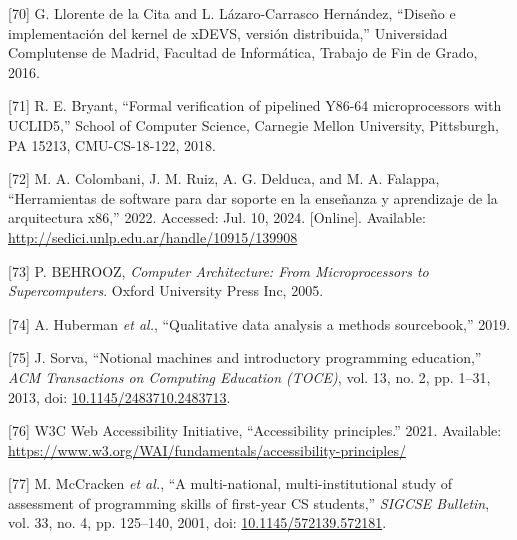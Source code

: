 \documentclass[12pt,oneside]{templates/unerthesis}
\newcommand{\CSLLeftMargin}[1]{#1} %
\newcommand{\CSLRightInline}[1]{#1} %
\newlength{\cslhangindent}
\newenvironment{CSLReferences}[2] %
 {\setlength{\parindent}{0pt}%
  \setlength{\leftskip}{#1 pt\relax}%
  \setlength{\parskip}{#2 pt\relax}%
  \everypar{\setlength{\hangindent}{\cslhangindent}}}
 {\par}
\begin{document}
\begin{CSLReferences}{0}{0}
\leavevmode{}%
\CSLLeftMargin{{[}70{]} }%
\CSLRightInline{G. Llorente de la Cita and L. Lázaro-Carrasco Hernández, {``Diseño e implementación del kernel de xDEVS, versión distribuida,''} Universidad Complutense de Madrid, Facultad de Informática, Trabajo de Fin de Grado, 2016.}

\leavevmode{}%
\CSLLeftMargin{{[}71{]} }%
\CSLRightInline{R. E. Bryant, {``Formal verification of pipelined Y86-64 microprocessors with UCLID5,''} School of Computer Science, Carnegie Mellon University, Pittsburgh, PA 15213, CMU-CS-18-122, 2018.}

\leavevmode{}%
\CSLLeftMargin{{[}72{]} }%
\CSLRightInline{M. A. Colombani, J. M. Ruiz, A. G. Delduca, and M. A. Falappa, {``Herramientas de software para dar soporte en la enseñanza y aprendizaje de la arquitectura x86,''} 2022. Accessed: Jul. 10, 2024. {[}Online{]}. Available: \url{http://sedici.unlp.edu.ar/handle/10915/139908}}

\leavevmode{}%
\CSLLeftMargin{{[}73{]} }%
\CSLRightInline{P. BEHROOZ, \emph{Computer {Architecture}: {From} {Microprocessors} to {Supercomputers}}. Oxford University Press Inc, 2005.}

\leavevmode{}%
\CSLLeftMargin{{[}74{]} }%
\CSLRightInline{A. Huberman \emph{et al.}, {``Qualitative data analysis a methods sourcebook,''} 2019.}

\leavevmode{}%
\CSLLeftMargin{{[}75{]} }%
\CSLRightInline{J. Sorva, {``Notional machines and introductory programming education,''} \emph{ACM Transactions on Computing Education (TOCE)}, vol. 13, no. 2, pp. 1--31, 2013, doi: \href{https://doi.org/10.1145/2483710.2483713}{10.1145/2483710.2483713}.}

\leavevmode{}%
\CSLLeftMargin{{[}76{]} }%
\CSLRightInline{W3C Web Accessibility Initiative, {``Accessibility principles.''} 2021. Available: \url{https://www.w3.org/WAI/fundamentals/accessibility-principles/}}

\leavevmode{}%
\CSLLeftMargin{{[}77{]} }%
\CSLRightInline{M. McCracken \emph{et al.}, {``A multi-national, multi-institutional study of assessment of programming skills of first-year CS students,''} \emph{SIGCSE Bulletin}, vol. 33, no. 4, pp. 125--140, 2001, doi: \href{https://doi.org/10.1145/572139.572181}{10.1145/572139.572181}.}


\end{CSLReferences}
\end{document}
